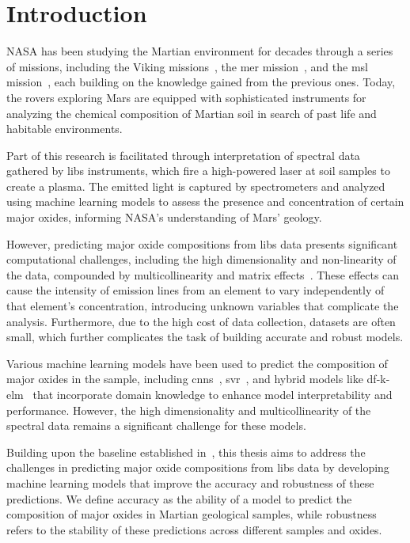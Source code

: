 \section{Introduction}\label{sec:introduction}
NASA has been studying the Martian environment for decades through a series of missions, including the Viking missions~\cite{marsnasagov_vikings}, the \gls{mer} mission~\cite{marsnasagov_observer, marsnasagov_spirit_opportunity}, and the \gls{msl} mission~\cite{marsnasagov_msl}, each building on the knowledge gained from the previous ones.
Today, the rovers exploring Mars are equipped with sophisticated instruments for analyzing the chemical composition of Martian soil in search of past life and habitable environments.

Part of this research is facilitated through interpretation of spectral data gathered by \gls{libs} instruments, which fire a high-powered laser at soil samples to create a plasma.
The emitted light is captured by spectrometers and analyzed using machine learning models to assess the presence and concentration of certain major oxides, informing NASA's understanding of Mars' geology.

However, predicting major oxide compositions from \gls{libs} data presents significant computational challenges, including the high dimensionality and non-linearity of the data, compounded by multicollinearity and matrix effects~\cite{andersonImprovedAccuracyQuantitative2017}. 
These effects can cause the intensity of emission lines from an element to vary independently of that element's concentration, introducing unknown variables that complicate the analysis. 
Furthermore, due to the high cost of data collection, datasets are often small, which further complicates the task of building accurate and robust models.

Various machine learning models have been used to predict the composition of major oxides in the sample, including \glspl{cnn}~\cite{yang_laser-induced_2022, yangConvolutionalNeuralNetwork2022}, \gls{svr}~\cite{rezaei_dimensionality_reduction}, and hybrid models like \gls{df}-\gls{k-elm}~\cite{song_DF-K-ELM} that incorporate domain knowledge to enhance model interpretability and performance.
However, the high dimensionality and multicollinearity of the spectral data remains a significant challenge for these models.

Building upon the baseline established in~\citet{p9_paper}, this thesis aims to address the challenges in predicting major oxide compositions from \gls{libs} data by developing machine learning models that improve the accuracy and robustness of these predictions. 
We define accuracy as the ability of a model to predict the composition of major oxides in Martian geological samples, while robustness refers to the stability of these predictions across different samples and oxides.

